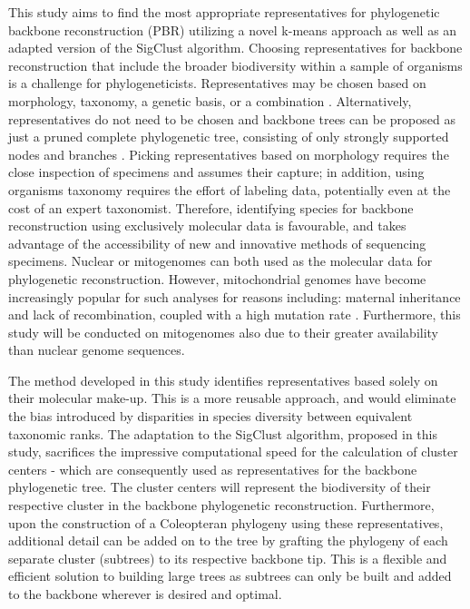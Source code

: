 \documentclass[12pt]{article}
\begin{document}
  This study aims to find the most appropriate representatives for phylogenetic backbone reconstruction (PBR) utilizing a novel k-means approach as well as an adapted version of the SigClust algorithm. Choosing representatives for backbone reconstruction that include the broader biodiversity within a sample of organisms is a challenge for phylogeneticists. Representatives may be chosen based on morphology, taxonomy, a genetic basis, or a combination \cite{orlov}. Alternatively, representatives do not need to be chosen and backbone trees can be proposed as just a pruned complete phylogenetic tree, consisting of only strongly supported nodes and branches \cite{creedy2024}. Picking representatives based on morphology requires the close inspection of specimens and assumes their capture; in addition, using organisms taxonomy requires the effort of labeling data, potentially even at the cost of an expert taxonomist. Therefore, identifying species for backbone reconstruction using exclusively molecular data is favourable, and takes advantage of the accessibility of new and innovative methods of sequencing specimens. Nuclear or mitogenomes can both used as the molecular data for phylogenetic reconstruction. However, mitochondrial genomes have become increasingly popular for such analyses for reasons including: maternal inheritance and lack of recombination, coupled with a high mutation rate \cite{YU}. Furthermore, this study will be conducted on mitogenomes also due to their greater availability than nuclear genome sequences.
  
  The method developed in this study identifies representatives based solely on their molecular make-up.  This is a more reusable approach, and would eliminate the bias introduced by disparities in species diversity between equivalent taxonomic ranks. The adaptation to the SigClust algorithm, proposed in this study, sacrifices the impressive computational speed for the calculation of cluster centers - which are consequently used as representatives for the backbone phylogenetic tree. The cluster centers will represent the biodiversity of their respective cluster in the backbone phylogenetic reconstruction. Furthermore, upon the construction of a Coleopteran phylogeny using these representatives, additional detail can be added on to the tree by grafting the phylogeny of each separate cluster (subtrees) to its respective backbone tip. This is a flexible and efficient solution to building large trees as subtrees can only be built and added to the backbone wherever is desired and optimal.
  
\end{document}
